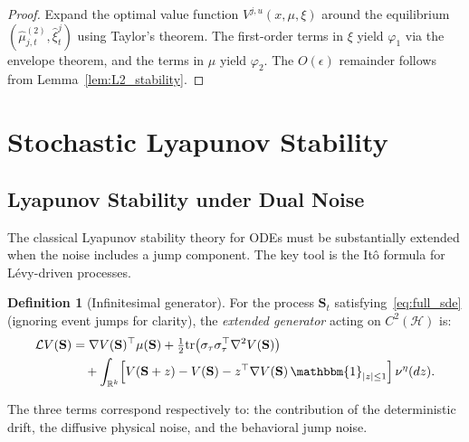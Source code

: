 \documentclass[12pt,a4paper]{article}
\theoremstyle{plain}
\theoremstyle{definition}
\newtheorem{definition}[theorem]{Definition}
\newcommand{\R}{\mathbb{R}}
\newcommand{\Hil}{\mathcal{H}}
\newcommand{\tr}{\mathrm{tr}}
\newcommand{\1}{\mathbbm{1}}
\newcommand{\vp}{\varphi}
\begin{document}
\begin{proof}
Expand the optimal value function $V^{j,u}(x, \mu, \xi)$ around the equilibrium
$(\hat\mu^{(2)}_{j,t}, \hat\xi^j_t)$ using Taylor's theorem. The first-order
terms in $\xi$ yield $\vp_1$ via the envelope theorem, and the terms in $\mu$
yield $\vp_2$. The $O(\epsilon)$ remainder follows from Lemma~\ref{lem:L2_stability}.
\end{proof}

\section{Stochastic Lyapunov Stability}
\label{sec:stability}

\subsection{Lyapunov Stability under Dual Noise}

The classical Lyapunov stability theory for ODEs must be substantially extended
when the noise includes a jump component. The key tool is the Itô formula for
Lévy-driven processes.

\begin{definition}[Infinitesimal generator]
\label{def:generator}
For the process $\mathbf{S}_t$ satisfying~\eqref{eq:full_sde} (ignoring
event jumps for clarity), the \emph{extended generator} acting on
$C^2(\Hil)$ is:
\begin{align}
\label{eq:generator}
\mathcal{L}V(\mathbf{S})
&= \nabla V(\mathbf{S})^\top \mu(\mathbf{S})
   + \tfrac{1}{2}\tr\!\left(\sigma_\tau\sigma_\tau^\top \nabla^2 V(\mathbf{S})\right) \nonumber\\
&\quad + \int_{\R^k}\!\left[V(\mathbf{S}+z) - V(\mathbf{S})
         - z^\top\nabla V(\mathbf{S})\,\1_{|z|\leq 1}\right]\nu^\eta(dz).
\end{align}
\end{definition}

The three terms correspond respectively to: the contribution of the
deterministic drift, the diffusive physical noise, and the behavioral jump noise.
\end{document}
